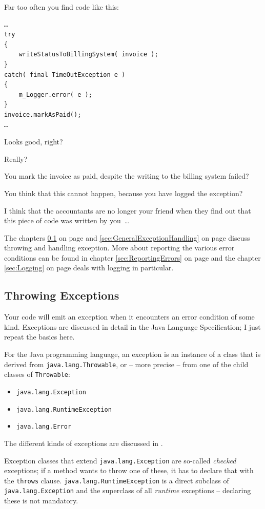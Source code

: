 \documentclass[11pt,a4paper, titlepage, parskip=half, headsepline, footsepline, cleardoublepage=current, headheight=1cm]{scrbook}
\newcommand*{\tqvref}[1]{\hyperref[{#1}]{\ref*{#1}} on page \pageref{#1}}
\begin{document}
Far too often you find code like this:
\begin{lstlisting}
…
try
{
    writeStatusToBillingSystem( invoice );
}
catch( final TimeOutException e )
{
    m_Logger.error( e );
}
invoice.markAsPaid();
…
\end{lstlisting}

Looks good, right?

Really?

You mark the invoice as paid, despite the writing to the billing system failed?

You think that this cannot happen, because you have logged the exception?

I think that the accountants are no longer your friend when they find out that this piece of code was written by you~…

The chapters \tqvref{sec:ThrowingExceptions} and \tqvref{sec:GeneralExceptionHandling} discuss throwing and handling exception. More about reporting the various error conditions can be found in chapter \tqvref{sec:ReportingErrors} and the chapter \tqvref{sec:Logging} deals with logging in particular.

\subsection{Throwing Exceptions}\label{sec:ThrowingExceptions}
Your code will emit an exception when it encounters an error condition of some kind. Exceptions are discussed in detail in the Java Language Specification\autocite{ORACLE_DOC_LANGUAGE_SPECIFICATION:Exceptions}; I just repeat the basics here.

For the Java programming language, an exception is an instance of a class that is derived from \lstinline|java.lang.Throwable|\autocite{ORACLE_DOC_THROWABLE_CLASS}, or – more precise – from one of the child classes of \lstinline|Throwable|:
\begin{itemize}[nosep]
\item{\lstinline|java.lang.Exception|\autocite{ORACLE_DOC_EXCEPTION_CLASS}}
\item{\lstinline|java.lang.RuntimeException|\autocite{ORACLE_DOC_RUNTIMEEXCEPTION_CLASS}}
\item{\lstinline|java.lang.Error|\autocite{ORACLE_DOC_ERROR_CLASS}}
\end{itemize}

The different kinds of exceptions are discussed in \autocite{ORACLE_DOC_LANGUAGE_SPECIFICATION:KindsOfExceptions}.

Exception classes that extend \lstinline|java.lang.Exception| are so-called \textit{checked} exceptions; if a method wants to throw one of these, it has to declare that with the \lstinline|throws| clause. \lstinline|java.lang.RuntimeException| is a direct subclass of \lstinline|java.lang.Exception| and the superclass of all \textit{runtime} exceptions – declaring these is not mandatory.
\end{document}

